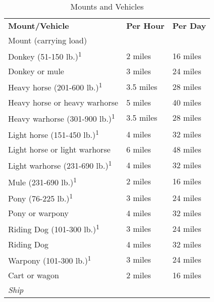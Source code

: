 \begin{table}[htb]
\sffamily
{}
\caption{Mounts and Vehicles}
\begin{tabular}{lll}
\textbf{Mount/Vehicle} & \textbf{Per Hour} & \textbf{Per Day}\\
Mount (carrying load) & & \\
\hspace{1em}Donkey (51-150 lb.)\textsuperscript{1} & 2 miles & 16 miles\\
\hspace{1em}Donkey or mule & 3 miles & 24 miles\\
\hspace{1em}Heavy horse (201-600 lb.)\textsuperscript{1} & 3.5 miles & 28 miles\\
\hspace{1em}Heavy horse or heavy warhorse & 5 miles & 40 miles\\
\hspace{1em}Heavy warhorse (301-900 lb.)\textsuperscript{1} & 3.5 miles & 28 miles\\
\hspace{1em}Light horse (151-450 lb.)\textsuperscript{1} & 4 miles & 32 miles\\
\hspace{1em}Light horse or light warhorse & 6 miles & 48 miles\\
\hspace{1em}Light warhorse (231-690 lb.)\textsuperscript{1} & 4 miles & 32 miles\\
\hspace{1em}Mule (231-690 lb.)\textsuperscript{1} & 2 miles & 16 miles\\
\hspace{1em}Pony (76-225 lb.)\textsuperscript{1} & 3 miles & 24 miles\\
\hspace{1em}Pony or warpony & 4 miles & 32 miles\\
\hspace{1em}Riding Dog (101-300 lb.)\textsuperscript{1} & 3 miles & 24 miles\\
\hspace{1em}Riding Dog & 4 miles & 32 miles\\
\hspace{1em}Warpony (101-300 lb.)\textsuperscript{1} & 3 miles & 24 miles\\
Cart or wagon & 2 miles & 16 miles\\
\textit{Ship} & & \\

\end{tabular}
\end{table}
